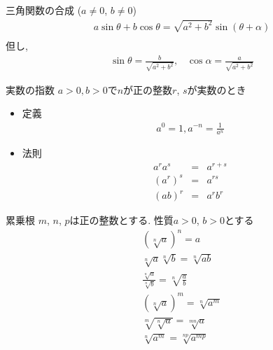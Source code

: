 \documentclass[aspectratio=169, 12pt]{beamer} %
\begin{document}
\begin{frame}{三角関数の合成 ($a\neq0$, $b\neq 0$)}
    \begin{eqnarray*}
        a\sin\theta +b\cos\theta = \sqrt{a^2+b^2}\sin(\theta + \alpha) \\
    \end{eqnarray*}
    但し,
    \begin{eqnarray*}
        \sin\theta=\frac{b}{\sqrt{a^2+b^2}}, \;\;\;\cos\alpha =\frac{a}{\sqrt{a^2+b^2}}
    \end{eqnarray*}
\end{frame}
\begin{frame}{実数の指数}
    $a>0, b>0$で$n$が正の整数$r$, $s$が実数のとき
    \begin{itemize}
        \item 定義
              \begin{eqnarray*}
                  a^0=1, a^{-n}=\frac{1}{a^n}
              \end{eqnarray*}
        \item 法則
              \begin{eqnarray*}
                  a^ra^s&=&a^{r+s} \\
                  (a^r)^s&=&a^{rs} \\
                  (ab)^r&=&a^rb^r
              \end{eqnarray*}
    \end{itemize}
\end{frame}
\begin{frame}{累乗根}
    $m$, $n$, $p$は正の整数とする. 性質$a>0$, $b>0$とする
    \begin{eqnarray*}
        (\sqrt[n]{a})^n = a \\
        \sqrt[n]{a}\sqrt[n]{b}=\sqrt[n]{ab} \\
        \frac{\sqrt[n]{a}}{\sqrt[n]{b}}=\sqrt[n]{\frac{a}{b}} \\
        (\sqrt[n]{a})^m=\sqrt[n]{a^m} \\
        \sqrt[m]{\sqrt[n]{a}}=\sqrt[mn]{a} \\
        \sqrt[n]{a^m}=\sqrt[np]{a^{mp}}
    \end{eqnarray*}
\end{frame}
\end{document}
